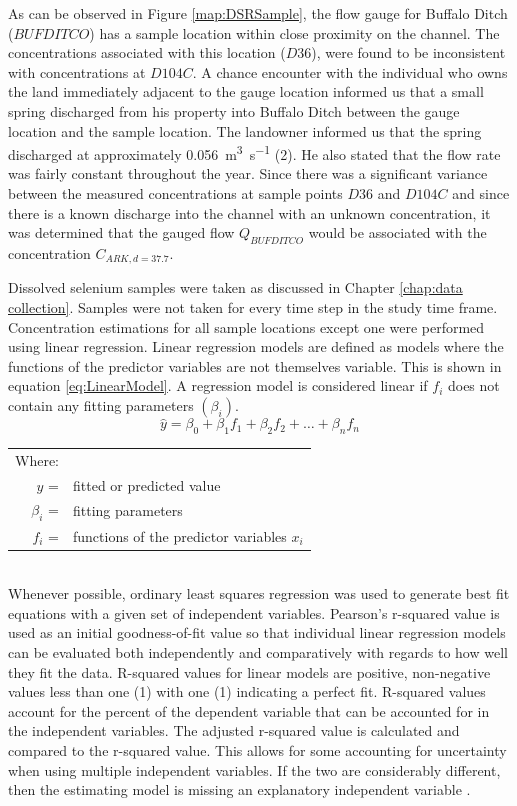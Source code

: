 As can be observed in Figure \ref{map:DSRSample}, the flow gauge for Buffalo Ditch ($ BUFDITCO $) has a sample location within close proximity on the channel.  The concentrations associated with this location ($ D36 $), were found to be inconsistent with concentrations at $ D104C $.  A chance encounter with the individual who owns the land immediately adjacent to the gauge location informed us that a small spring discharged from his property into Buffalo Ditch between the gauge location and the sample location.  The landowner informed us that the spring discharged at approximately \SI{0.056}{\cubic\meter\per\second} (\SI{2}{\cfs}).  He also stated that the flow rate was fairly constant throughout the year.  Since there was a significant variance between the measured concentrations at sample points $ D36 $ and $ D104C $ and since there is a known discharge into the channel with an unknown concentration, it was determined that the gauged flow $ Q_{BUFDITCO} $ would be associated with the concentration $ C_{ARK,d=37.7} $.


Dissolved selenium samples were taken as discussed in Chapter \ref{chap:data collection}.  Samples were not taken for every time step in the study time frame.  Concentration estimations for all sample locations except one were performed using linear regression.  Linear regression models are defined as models where the functions of the predictor variables are not themselves variable.  This is shown in equation \ref{eq:LinearModel}.  A regression model is considered linear if $f_i$ does not contain any fitting parameters $(\beta_i)$.
\begin{equation}
\label{eq:LinearModel}
\hat{y}=\beta_0+\beta_1 f_1+\beta_2 f_2+\ldots+\beta_n f_n
\end{equation}
\begin{tabular}{r p{5.5in}}
Where:&\\
$\hat{y}$ = & fitted or predicted value\\
$\beta_i$ = & fitting parameters\\
$f_i$ = & functions of the predictor variables $x_i$\\
\end{tabular}\\

Whenever possible, ordinary least squares regression was used to generate best fit equations with a given set of independent variables.  Pearson's r-squared value is used as an initial goodness-of-fit value so that individual linear regression models can be evaluated both independently and comparatively with regards to how well they fit the data.  R-squared values for linear models are positive, non-negative values less than one (1) with one (1) indicating a perfect fit.  R-squared values account for the percent of the dependent variable that can be accounted for in the independent variables.  The adjusted r-squared value is calculated and compared to the r-squared value.  This allows for some accounting for uncertainty when using multiple independent variables. If the two are considerably different, then the estimating model is missing an explanatory independent variable \parencite{Johnson2007}.


